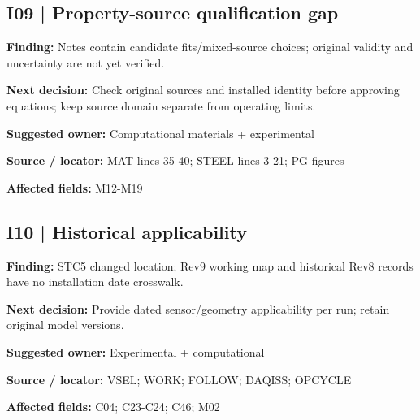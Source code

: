 \documentclass[11pt]{article}
\begin{document}
\par\noindent\begin{minipage}{\textwidth}\small\setlength{\parskip}{2pt}
\subsection*{I09 | Property-source qualification gap}
\textbf{Finding:} Notes contain candidate fits/mixed-source choices; original validity and uncertainty are not yet verified.\par
\textbf{Next decision:} Check original sources and installed identity before approving equations; keep source domain separate from operating limits.\par
\textbf{Suggested owner:} Computational materials + experimental\par
\textbf{Source / locator:} MAT lines 35-40; STEEL lines 3-21; PG figures\par
\textbf{Affected fields:} M12-M19\par
\end{minipage}\par\vspace{8pt}
\par\noindent\begin{minipage}{\textwidth}\small\setlength{\parskip}{2pt}
\subsection*{I10 | Historical applicability}
\textbf{Finding:} STC5 changed location; Rev9 working map and historical Rev8 records have no installation date crosswalk.\par
\textbf{Next decision:} Provide dated sensor/geometry applicability per run; retain original model versions.\par
\textbf{Suggested owner:} Experimental + computational\par
\textbf{Source / locator:} VSEL; WORK; FOLLOW; DAQISS; OPCYCLE\par
\textbf{Affected fields:} C04; C23-C24; C46; M02\par
\end{minipage}\par\vspace{8pt}
\end{document}
